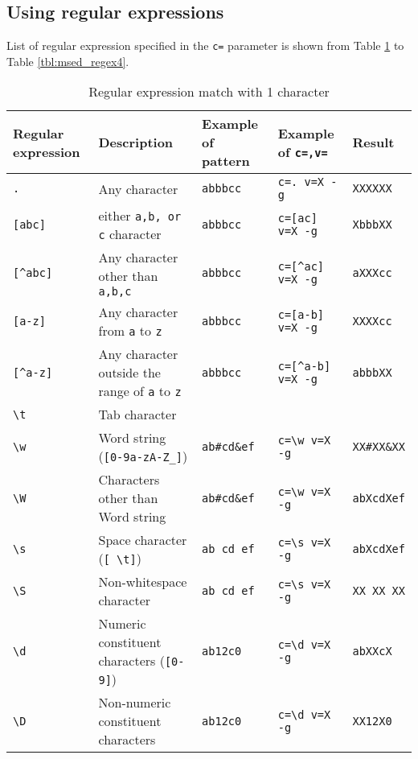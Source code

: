 \subsection*{Using regular expressions}
List of regular expression specified in the \verb|c=| parameter  is shown from Table \ref{tbl:msed_regex1}  to Table \ref{tbl:msed_regex4}.

\begin{table}[htbp]
\begin{center}
{\small
\caption{Regular expression match with 1 character\label{tbl:msed_regex1}}
\begin{tabular}{l|l|l|l|l}
\hline
Regular expression      & Description                                      & Example of pattern             & Example of \verb|c=,v=|        & Result \\
\hline
\verb|.|      & Any character                              & \verb|abbbcc|   & \verb|c=. v=X -g|      & \verb|XXXXXX| \\
\verb|[abc]|	& either \verb|a,b, or c| character              & \verb|abbbcc|   & \verb|c=[ac] v=X -g|   & \verb|XbbbXX| \\
\verb|[^abc]| & Any character other than \verb|a,b,c|             & \verb|abbbcc|   & \verb|c=[^ac] v=X -g|  & \verb|aXXXcc| \\
\verb|[a-z]|  & Any character from \verb|a| to \verb|z|   & \verb|abbbcc|   & \verb|c=[a-b] v=X -g|  & \verb|XXXXcc| \\
\verb|[^a-z]| & Any character outside the range of \verb|a| to \verb|z| & \verb|abbbcc|   & \verb|c=[^a-b] v=X -g| & \verb|abbbXX| \\
\verb|\t|     & Tab character                                   &                 &                        & \\
\verb|\w|     & Word string (\verb|[0-9a-zA-Z_]|)          & \verb|ab#cd&ef| & \verb|c=\w v=X -g|     & \verb|XX#XX&XX| \\
\verb|\W|     & Characters other than Word string                           & \verb|ab#cd&ef| & \verb|c=\w v=X -g|     & \verb|abXcdXef| \\
\verb|\s|     & Space character (\verb|[ \t]|)                     & \verb|ab cd ef| & \verb|c=\s v=X -g|     & \verb|abXcdXef|\\
\verb|\S|     & Non-whitespace character                              & \verb|ab cd ef| & \verb|c=\s v=X -g|     & \verb|XX XX XX|\\
\verb|\d|     & Numeric constituent characters (\verb|[0-9]|)             & \verb|ab12c0|   & \verb|c=\d v=X -g|     & \verb|abXXcX|\\
\verb|\D|     & Non-numeric constituent characters                       & \verb|ab12c0|   & \verb|c=\d v=X -g|     & \verb|XX12X0|\\
\hline
\end{tabular} 
}
\end{center}
\end{table} 


